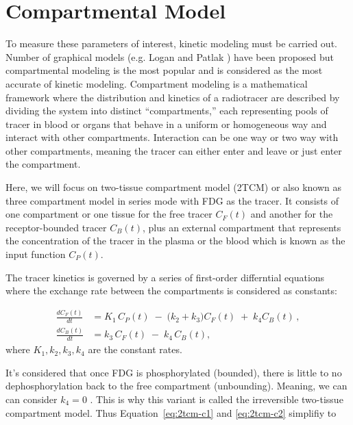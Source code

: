 
\section{Compartmental Model}
To measure these parameters of interest, kinetic modeling must be carried out. Number of graphical models (e.g. Logan \cite{TODO} and Patlak \cite{TODO}) have been proposed but compartmental modeling is the most popular and is considered as the most accurate of kinetic modeling.
Compartment modeling is a mathematical framework where the distribution and kinetics of a radiotracer are described by dividing the system into distinct “compartments,” each representing pools of tracer in blood or organs that behave in a uniform or homogeneous way and interact with other compartments.
Interaction can be one way or two way with other compartments, meaning the tracer can either enter and leave or just enter the compartment.

Here, we will focus on two-tissue compartment model (2TCM) or also known as three compartment model in series mode with FDG as the tracer.
It consists of one compartment or one tissue for the free tracer \(C_F(t)\) and another for the receptor-bounded tracer \(C_B(t)\), plus an external compartment that represents the concentration of the tracer in the plasma or the blood which is known as the input function \(C_P(t)\).

The tracer kinetics is governed by a series of first-order differntial equations where the exchange rate between the compartments is considered as constants:

\begin{align}
	\frac{dC_F(t)}{dt} & = K_1 \, C_P(t) \;-\; \bigl(k_2 + k_3\bigr) C_F(t) \;+\; k_4 C_B(t) \,, \label{eq:2tcm-c1} \\[6pt]
	\frac{dC_B(t)}{dt} & = k_3 \, C_F(t) \;-\; k_4 \, C_B(t), \label{eq:2tcm-c2}
\end{align}
where  \(K_1, k_2, k_3, k_4\) are the constant rates.

It's considered that once FDG is phosphorylated (bounded), there is little to no dephosphorylation back to the free compartment (unbounding).
Meaning, we can can consider \(k_4=0\) \cite{TODO}.
This is why this variant is called the irreversible two-tissue compartment model.
Thus Equation~\eqref{eq:2tcm-c1} and \eqref{eq:2tcm-c2} simplifiy to

